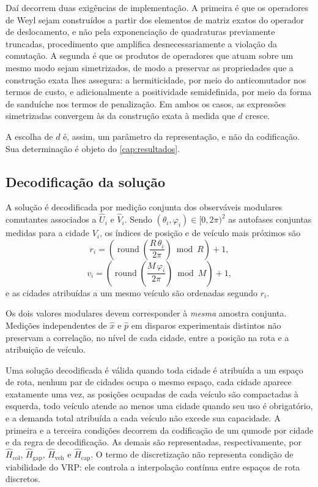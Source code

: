         Daí decorrem duas exigências de implementação. A primeira é que os operadores de Weyl sejam construídos a partir dos elementos de matriz exatos do operador de deslocamento, e não pela exponenciação de quadraturas previamente truncadas, procedimento que amplifica desnecessariamente a violação da comutação. A segunda é que os produtos de operadores que atuam sobre um mesmo modo sejam simetrizados, de modo a preservar as propriedades que a construção exata lhes assegura: a hermiticidade, por meio do anticomutador nos termos de custo, e adicionalmente a positividade semidefinida, por meio da forma de sanduíche nos termos de penalização. Em ambos os casos, as expressões simetrizadas convergem às da construção exata à medida que $d$ cresce.

        A escolha de $d$ é, assim, um parâmetro da representação, e não da codificação. Sua determinação é objeto do \autoref{cap:resultados}.

    \subsection{Decodificação da solução}\label{subsec:form_mod_decodificacao}

        A solução é decodificada por medição conjunta dos observáveis modulares comutantes associados a $\hat{U}_i$ e $\hat{V}_i$. Sendo $(\theta_i, \varphi_i) \in [0, 2\pi)^2$ as autofases conjuntas medidas para a cidade $V_i$, os índices de posição e de veículo mais próximos são
        \begin{equation}\label{eq:form_mod_decod_r}
            r_i = \left( \operatorname{round}\!\left( \frac{R\,\theta_i}{2\pi} \right) \bmod R \right) + 1 ,
        \end{equation}
        \begin{equation}\label{eq:form_mod_decod_v}
            v_i = \left( \operatorname{round}\!\left( \frac{M\,\varphi_i}{2\pi} \right) \bmod M \right) + 1 ,
        \end{equation}
        \noindent e as cidades atribuídas a um mesmo veículo são ordenadas segundo $r_i$.

        Os dois valores modulares devem corresponder à \emph{mesma} amostra conjunta. Medições independentes de $\hat{x}$ e $\hat{p}$ em disparos experimentais distintos não preservam a correlação, no nível de cada cidade, entre a posição na rota e a atribuição de veículo.

        Uma solução decodificada é válida quando toda cidade é atribuída a um espaço de rota, nenhum par de cidades ocupa o mesmo espaço, cada cidade aparece exatamente uma vez, as posições ocupadas de cada veículo são compactadas à esquerda, todo veículo atende ao menos uma cidade quando seu uso é obrigatório, e a demanda total atribuída a cada veículo não excede sua capacidade. A primeira e a terceira condições decorrem da codificação de um qumode por cidade e da regra de decodificação. As demais são representadas, respectivamente, por $\hat{H}_{\text{col}}$, $\hat{H}_{\text{gap}}$, $\hat{H}_{\text{veh}}$ e $\hat{H}_{\text{cap}}$. O termo de discretização não representa condição de viabilidade do VRP: ele controla a interpolação contínua entre espaços de rota discretos.

